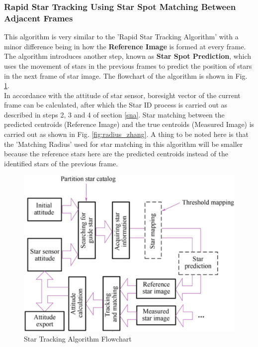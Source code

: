 \documentclass[../../main.tex]{subfiles}
\begin{document}
\subsubsection{Rapid Star Tracking Using Star Spot Matching Between Adjacent Frames} \label{zhang}
This algorithm is very similar to the 'Rapid Star Tracking Algorithm' with a minor difference being in how the \textbf{Reference Image} is formed at every frame. The algorithm introduces another step, known as \textbf{Star Spot Prediction}, which uses the movement of stars in the previous frames to predict the position of stars in the next frame of star image. The flowchart of the algorithm is shown in Fig. \ref{fig:zhang_tracking_flowchart}.\\
In accordance with the attitude of star sensor, boresight vector of the current frame can be calculated, after which the Star ID process is carried out as described in steps 2, 3 and 4 of section \ref{sna}. 
Star matching between the predicted centroids (Reference Image) and the true centroids (Measured Image) is carried out as shown in Fig. \ref{fig:radius_zhang}. A thing to be noted here is that the 'Matching Radius' used for star matching in this algorithm will be smaller because the reference stars here are the predicted centroids instead of the identified stars of the previous frame. 
\begin{figure}[!h]
        \centering
        \includegraphics[scale=0.35]{Figures/GNC/zhang_tracking_flowchart.png}
        \caption{Star Tracking Algorithm Flowchart}
        \label{fig:zhang_tracking_flowchart}
\end{figure}\\
\end{document}
